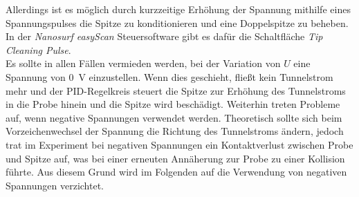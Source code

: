 \documentclass[a4paper,twoside,final]{article}
\begin{document}
Allerdings ist es möglich durch kurzzeitige Erhöhung der Spannung mithilfe eines Spannungspulses die Spitze zu konditionieren und eine Doppelspitze zu beheben. In der \textit{Nanosurf easyScan} Steuersoftware gibt es dafür die Schaltfläche \textit{Tip Cleaning Pulse}.\\
Es sollte in allen Fällen vermieden werden, bei der Variation von $U$ eine Spannung von \SI{0}{\volt} einzustellen. Wenn dies geschieht, fließt kein Tunnelstrom mehr und der PID-Regelkreis steuert die Spitze zur Erhöhung des Tunnelstroms in die Probe hinein und die Spitze wird beschädigt. Weiterhin treten Probleme auf, wenn negative Spannungen verwendet werden. Theoretisch sollte sich beim Vorzeichenwechsel der Spannung die Richtung des Tunnelstroms ändern, jedoch trat im Experiment bei negativen Spannungen ein Kontaktverlust zwischen Probe und Spitze auf, was bei einer erneuten Annäherung zur Probe zu einer Kollision führte. Aus diesem Grund wird im Folgenden auf die Verwendung von negativen Spannungen verzichtet.
\end{document}
